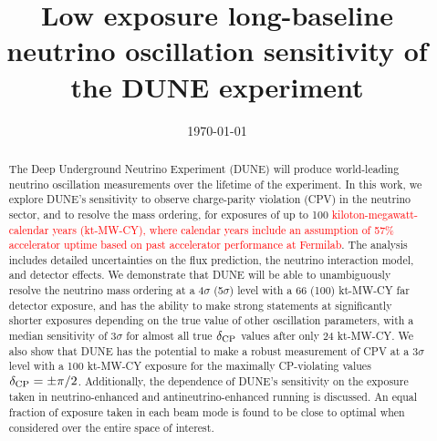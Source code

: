 \documentclass[aps,prd,twocolumn,showpacs,superscriptaddress,nofootinbib,floatfix,letterpaper]{revtex4-1}
\newcommand{\deltacp}{\ensuremath{\delta_{\rm CP}}\xspace}   %
\newcommand{\new}[1]{\textcolor{red}{#1}}
\begin{document}
\title{Low exposure long-baseline neutrino oscillation sensitivity of the DUNE experiment}
\date{\today}

\linenumbers
\begin{abstract}
The Deep Underground Neutrino Experiment (DUNE) will produce world-leading neutrino oscillation measurements over the lifetime of the experiment. In this work, we explore DUNE's sensitivity to observe charge-parity violation (CPV) in the neutrino sector, and to resolve the mass ordering, for exposures of up to 100 \new{kiloton-megawatt-calendar years (kt-MW-CY), where calendar years include an assumption of 57\% accelerator uptime based on past accelerator performance at Fermilab}. The analysis includes detailed uncertainties on the flux prediction, the neutrino interaction model, and detector effects. We demonstrate that DUNE will be able to unambiguously resolve the neutrino mass ordering at a 4$\sigma$ (5$\sigma$) level with a 66 (100) kt-MW-CY far detector exposure, and has the ability to make strong statements at significantly shorter exposures depending on the true value of other oscillation parameters, with a median sensitivity of 3$\sigma$ for almost all true \deltacp values after only 24 kt-MW-CY. We also show that DUNE has the potential to make a robust measurement of CPV at a 3$\sigma$ level with a 100 kt-MW-CY exposure for the maximally CP-violating values $\deltacp = \pm\pi/2$. Additionally, the dependence of DUNE's sensitivity on the exposure taken in neutrino-enhanced and antineutrino-enhanced running is discussed. An equal fraction of exposure taken in each beam mode is found to be close to optimal when considered over the entire space of interest.
\end{abstract}

\maketitle








\FloatBarrier


\appendix*

\end{document}

